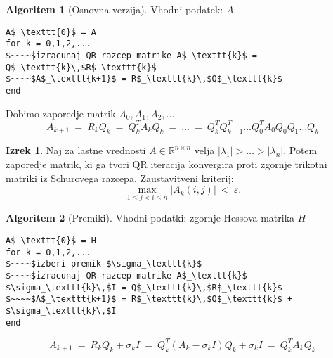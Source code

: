 \documentclass[11pt]{article}
\newcommand{\R}{\mathbb{R}}
\theoremstyle{definition}
\theoremstyle{definition}
\newtheorem{izrek}{Izrek}[section]
\newtheorem*{algoritem}{Algoritem}
\begin{document}
\begin{algoritem}[Osnovna verzija]

Vhodni podatek: $A$
\begin{lstlisting}
A$_\texttt{0}$ = A
for k = 0,1,2,...
$~~~~$izracunaj QR razcep matrike A$_\texttt{k}$ = Q$_\texttt{k}\,$R$_\texttt{k}$
$~~~~$A$_\texttt{k+1}$ = R$_\texttt{k}\,$Q$_\texttt{k}$
end
\end{lstlisting}
Dobimo zaporedje matrik $A_0, A_1, A_2, \ldots$
$$A_{k+1} ~=~ R_k Q_k ~=~ Q_k^T A_k Q_k ~=~ \ldots ~=~ Q_k^T Q_{k-1}^T \ldots Q_0^T A_0 Q_0 Q_1 \ldots Q_k$$

\end{algoritem}
\vspace{0.5cm}

\begin{izrek}

Naj za lastne vrednosti $A \in \R^{n \times n}$ velja $|\lambda_1| > \ldots > |\lambda_n|$. Potem zaporedje matrik, ki ga tvori QR iteracija konvergira proti zgornje trikotni matriki iz Schurovega razcepa. Zaustavitveni kriterij:
$$\max_{1 \leq j < i \leq n}{|A_k(i, j)|} ~<~ \varepsilon.$$

\end{izrek}
\vspace{0.5cm}

\begin{algoritem}[Premiki]

Vhodni podatki: zgornje Hessova matrika $H$
\begin{lstlisting}
A$_\texttt{0}$ = H
for k = 0,1,2,...
$~~~~$izberi premik $\sigma_\texttt{k}$
$~~~~$izracunaj QR razcep matrike A$_\texttt{k}$ - $\sigma_\texttt{k}\,$I = Q$_\texttt{k}\,$R$_\texttt{k}$
$~~~~$A$_\texttt{k+1}$ = R$_\texttt{k}\,$Q$_\texttt{k}$ + $\sigma_\texttt{k}\,$I
end
\end{lstlisting}

$$A_{k+1} ~=~ R_k Q_k + \sigma_k I ~=~ Q_k^T(A_k - \sigma_k I)Q_k + \sigma_k I ~=~ Q_k^T A_k Q_k$$

\end{algoritem}
\vspace{0.5cm}


\pagebreak

\end{document}
